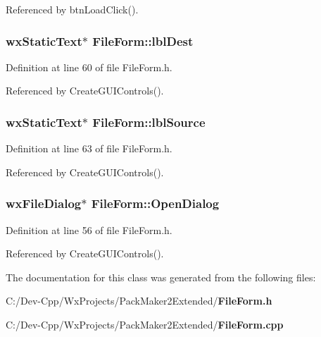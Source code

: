 Referenced by btn\-Load\-Click().
\subsubsection{\setlength{\rightskip}{0pt plus 5cm}wx\-Static\-Text$\ast$ {\bf File\-Form::lbl\-Dest}\hspace{0.3cm}{\tt  [private]}}\label{class_file_form_96e4786abc58d3016944326b9da10874}




Definition at line 60 of file File\-Form.h.

Referenced by Create\-GUIControls().
\subsubsection{\setlength{\rightskip}{0pt plus 5cm}wx\-Static\-Text$\ast$ {\bf File\-Form::lbl\-Source}\hspace{0.3cm}{\tt  [private]}}\label{class_file_form_ac49b50f320285340085a01addec65e5}




Definition at line 63 of file File\-Form.h.

Referenced by Create\-GUIControls().
\subsubsection{\setlength{\rightskip}{0pt plus 5cm}wx\-File\-Dialog$\ast$ {\bf File\-Form::Open\-Dialog}\hspace{0.3cm}{\tt  [private]}}\label{class_file_form_2b706a5f658b34ea5d2ace97d0e5d884}




Definition at line 56 of file File\-Form.h.

Referenced by Create\-GUIControls().

The documentation for this class was generated from the following files:\begin{CompactItemize}
\item 
C:/Dev-Cpp/Wx\-Projects/Pack\-Maker2Extended/{\bf File\-Form.h}\item 
C:/Dev-Cpp/Wx\-Projects/Pack\-Maker2Extended/{\bf File\-Form.cpp}\end{CompactItemize}
